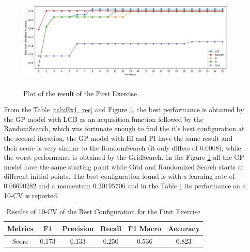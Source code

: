 \documentclass[12pt, onecolumn]{article}
\begin{document}
\begin{figure}[!h]
  \centering
  \includegraphics[width=\linewidth, height=5cm]{imgs/first.png}
  \caption{Plot of the result of the First Exercise}
  \label{fig:first}
\end{figure}
From the Table \ref{tab:Ex1_res} and Figure \ref{fig:first}, the best performance is obtained by the GP model with LCB as an acquisition function followed by the RandomSearch, which was fortunate enough to find the it's best configuration at the second iteration, the GP model with EI and PI have the same result and their score is very similar to the RandomSearch (it only differs of $0.0008$), while the worst performance is obtained by the GridSearch. In the Figure \ref{fig:first} all the GP model have the same starting point while Grid and Randomized Search starts at different initial points.
The best configuration found is with a learning rate of $0.06690282$ and a momentum $0.20195706$ and in the Table \ref{tab:best_1} its performance on a 10-CV is reported.
\begin{table}[!h]
  \centering
  \begin{tabular}{ |c|c|c|c|c|c| } 
    \hline
    Metrics& F1 & Precision & Recall & F1 Macro & Accuracy\\
    \hline
    Score& 0.173 & 0.133 & 0.250 & 0.536 & 0.823\\
    \hline
  \end{tabular}
  \caption{Results of 10-CV of the Best Configuration for the First Exercise}
  \label{tab:best_1}
\end{table}
\end{document}
